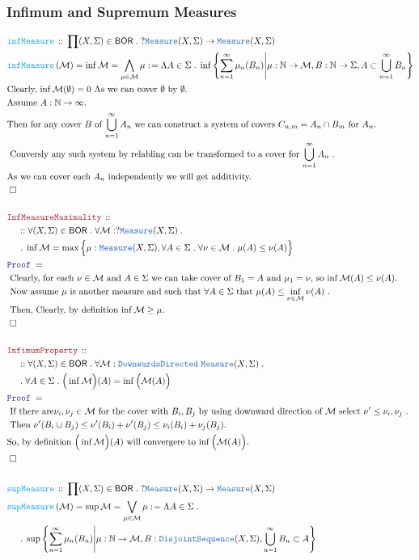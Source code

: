\documentclass[12pt]{scrartcl}
\newcommand{\TYPE}[1]{\textcolor{NavyBlue}{\mathtt{#1}}}
\newcommand{\FUNC}[1]{\textcolor{Cerulean}{\mathtt{#1}}}
\newcommand{\LOGIC}[1]{\textcolor{Blue}{\mathtt{#1}}}
\newcommand{\THM}[1]{\textcolor{Maroon}{\mathtt{#1}}}
\renewcommand{\.}{\; . \;}
\newcommand{\de}{: \kern 0.1pc =}
\newcommand{\Act}[1]{\left( #1 \right)}
\newcommand{\Theorem}[2]{& \THM{#1} \, :: \, #2 \\ & \Proof = \\ }
\newcommand{\DeclareFunc}[2]{& \FUNC{#1} \, :: \, #2 \\}
\newcommand{\DefineNamedFunc}[4]{&  \FUNC{#1}\Act{#2} = #3 \de #4 \\}
\newcommand{\NewLine}{\\ & \kern 1pc}
\newcommand{\Page}[1]{ \begin{align*} #1 \end{align*}   }
\newcommand{\Nat}{\mathbb{N} }
\newcommand{\QED}{\; \square}
\newcommand{\EndProof}{& \QED \\}
\newcommand{\Proof}{\LOGIC{Proof} \; }
\newcommand{\Explain}[1]{& \text{#1.} \\}
\newcommand{\BOR}{\mathsf{BOR}}
\newcommand{\Measure}{\TYPE{Measure}}
\begin{document}
\subsubsection{Infimum and Supremum Measures}
\Page{
	\DeclareFunc{infMeasure}{\prod (X,\Sigma) \in \BOR \. 
		?\Measure(X,\Sigma) \to \Measure(X,\Sigma)
	}
	\DefineNamedFunc{infMeasure}{\mathcal{M}}{\inf{\mathcal{M}} = 
		\bigwedge_{\mu \in \mathcal{M}} \mu}
	{
		\Lambda A \in \Sigma \.
		\inf\left\{
			\sum^\infty_{n=1} \mu_n(B_n) \Bigg| 
			\mu : \Nat \to \mathcal{M}, B : \Nat \to \Sigma,
			A \subset \bigcup^\infty_{n=1} B_n
		\right\}
	}
	\Explain{Clearly, $\inf {\mathcal{M}}(\emptyset) =0$ As we can cover $\emptyset$ by $\emptyset$}
	\Explain{Assume $A : \Nat \to \infty$}
	\Explain{Then for any cover $B$ of $\bigcup^\infty_{n=1} A_n$
		we can construct a system of covers $C_{n,m} = A_n \cap B_m$ for $A_n$}
	\Explain{ Conversly any such system by relabling can be transformed to a cover for 
		$\bigcup^\infty_{n=1} A_n$  }
	\Explain{As we can cover each $A_n$ independently we will get additivity}
	\EndProof
	\\
	\Theorem{InfMeasureMaximality}
	{
		\NewLine ::		
		\forall (X,\Sigma) \in \BOR \.
		\forall \mathcal{M} : ?\Measure(X,\Sigma) \. \NewLine \.
		\inf {\mathcal{M}} = 
		\max \Big\{ 
			\mu : \Measure(X,\Sigma), 
			\forall A \in \Sigma \. 
			\forall \nu \in \mathcal{M}  \.
			\mu(A) \le \nu(A)
		\Big\}
	}
	\Explain{ Clearly, for each $\nu \in \mathcal{M}$ and $A \in \Sigma$ 
		we can take cover of $B_1=A$ and $\mu_1=\nu$, so
		$\inf {\mathcal{M}}(A) \le \nu(A)$}
	\Explain{ Now assume 
		$\mu$ is another measure and such that $\forall A \in \Sigma$ 
		that $\mu(A)  \le  \inf_{\nu \in \mathcal{M }} \nu(A)$ 
	}
	\Explain{ Then, Clearly, by definition $\inf \mathcal{M} \ge \mu$}
	\EndProof
	\\
	\Theorem{InfimumProperty}
	{
		\NewLine ::
		\forall (X,\Sigma) \in \BOR \.
		\forall \mathcal{M} : \TYPE{DownwardsDirected}\;\Measure(X,\Sigma) \. \NewLine \.
		\forall A \in \Sigma \.
		\Big( \inf \mathcal{M}\Big)(A) = \inf \Big(\mathcal{M}(A)\Big) 
	}
	\Explain{ If there are$\nu_i,\nu_j \in \mathcal{M}$  for the cover with $B_i,B_j$  
		  by using downward direction of $\mathcal{M}$ select $\nu' \le \nu_i,\nu_j$	
	}
	\Explain{ Then $\nu'(B_i \cup B_j) \le \nu'(B_i) + \nu'(B_j) \le \nu_i(B_i) + \nu_j(B_j) $}
	\Explain{So, by definition $\Big( \inf \mathcal{M}\Big)(A) $ 
		will convergere to $\inf \Big(\mathcal{M}(A)\Big)$}
	\EndProof
	\\
	\DeclareFunc{supMeasure}{\prod (X,\Sigma) \in \BOR \. 
		?\Measure(X,\Sigma) \to \Measure(X,\Sigma)
	}
	\DefineNamedFunc{supMeasure}{\mathcal{M}}{\sup{\mathcal{M}} = 
		\bigvee_{\mu \in \mathcal{M}} \mu}
	{
		\Lambda A \in \Sigma \. \NewLine \.
		\sup\left\{
			\sum^\infty_{n=1} \mu_n(B_n) \Bigg| 
			\mu : \Nat \to \mathcal{M}, B : \TYPE{DisjointSequence}(X,\Sigma),
			\bigcup^\infty_{n=1} B_n \subset A
		\right\}
	}
}
\end{document}
